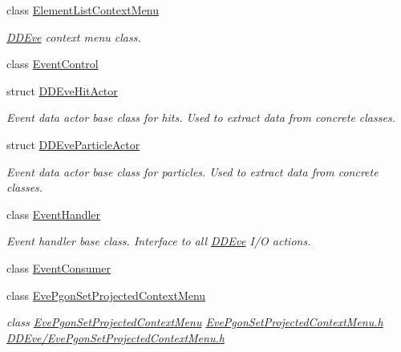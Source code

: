 \begin{DoxyCompactItemize}
class \hyperlink{class_d_d4hep_1_1_element_list_context_menu}{ElementListContextMenu}
\begin{DoxyCompactList}\small\item\em \hyperlink{struct_d_d4hep_1_1_d_d_eve}{DDEve} context menu class. \item\end{DoxyCompactList}\item 
class \hyperlink{class_d_d4hep_1_1_event_control}{EventControl}
\item 
struct \hyperlink{struct_d_d4hep_1_1_d_d_eve_hit_actor}{DDEveHitActor}
\begin{DoxyCompactList}\small\item\em Event data actor base class for hits. Used to extract data from concrete classes. \item\end{DoxyCompactList}\item 
struct \hyperlink{struct_d_d4hep_1_1_d_d_eve_particle_actor}{DDEveParticleActor}
\begin{DoxyCompactList}\small\item\em Event data actor base class for particles. Used to extract data from concrete classes. \item\end{DoxyCompactList}\item 
class \hyperlink{class_d_d4hep_1_1_event_handler}{EventHandler}
\begin{DoxyCompactList}\small\item\em Event handler base class. Interface to all \hyperlink{struct_d_d4hep_1_1_d_d_eve}{DDEve} I/O actions. \item\end{DoxyCompactList}\item 
class \hyperlink{class_d_d4hep_1_1_event_consumer}{EventConsumer}
\item 
class \hyperlink{class_d_d4hep_1_1_eve_pgon_set_projected_context_menu}{EvePgonSetProjectedContextMenu}
\begin{DoxyCompactList}\small\item\em class \hyperlink{class_d_d4hep_1_1_eve_pgon_set_projected_context_menu}{EvePgonSetProjectedContextMenu} \hyperlink{_eve_pgon_set_projected_context_menu_8h}{EvePgonSetProjectedContextMenu.h} \hyperlink{_eve_pgon_set_projected_context_menu_8h}{DDEve/EvePgonSetProjectedContextMenu.h} \item\end{DoxyCompactList}\item 

\end{DoxyCompactItemize}
